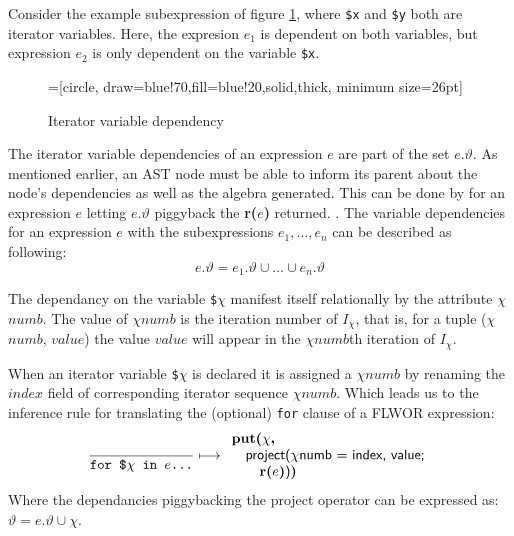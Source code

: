 Consider the example subexpression of figure \ref{fig:trans:td:varDep}, where \texttt{\$x} and \texttt{\$y} both
are iterator variables. Here, the expresion $e_{1}$ is dependent on both variables, but expression $e_{2}$ is only
dependent on the variable \texttt{\$x}.

\begin{figure}[h]
\centering
{}=[circle, draw=blue!70,fill=blue!20,solid,thick, minimum
size=26pt]
\label{fig:trans:td:varDep}
\caption[Iterator variable dependency]{Iterator variable dependency}
\end{figure}

The iterator variable dependencies of an expression $e$ are part of the set $e.\vartheta$. As mentioned earlier,
an AST node must be able to inform its parent about the node's dependencies as well as the algebra generated. This
can be done by for an expression $e$ letting $e.\vartheta$ piggyback the \textbf{r(}$e$\textbf{)} returned.
. The variable dependencies for an expression
$e$ with the subexpressions $e_{1},\ldots,e_{n}$ can be described as following:
\begin{equation*}
e.\vartheta = e_{1}.\vartheta\cup\ldots\cup e_{n}.\vartheta
\end{equation*}

The dependancy on the variable \texttt{\$}$\chi$ manifest itself relationally by the attribute $\chi$$numb$. The
value of $\chi$$numb$ is the iteration number of $I_{\chi}$, that is, for a tuple ($\chi$$numb$, $value$) the value
$value$ will appear in the $\chi$$numb$th iteration of $I_{\chi}$.

When an iterator variable \texttt{\$}$\chi$ is declared it is assigned a $\chi$$numb$ by renaming the $index$
field of corresponding iterator sequence $\chi$$numb$. Which leads us to the inference rule for translating the
(optional) \texttt{for} clause of a FLWOR expression:
\begin{equation}
\frac{}{\mbox{\texttt{for \$}}\chi \mbox{\texttt{ in }} e \mbox{\texttt{\ldots}}}\longmapsto
\begin{array}{l}
\mbox{\textbf{put(}}\chi\mbox{\textbf{, }} \\ \quad
\mbox{\textsf{project(}}\chi\mbox{\textsf{numb = index, value;}} \\ \quad \quad
\mbox{\textbf{r(}}e\mbox{\textbf{)}\textsf{)}\textbf{)}}
\end{array}
\label{rule:trans:td:forclause}
\end{equation}
Where the dependancies piggybacking the \textsf{project} operator can be expressed as:
$\vartheta = e.\vartheta \cup \chi$.

